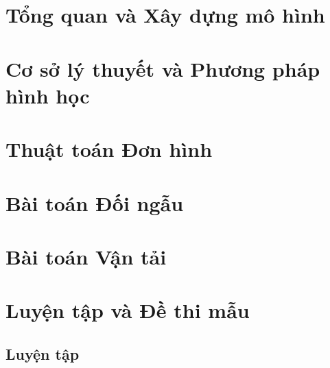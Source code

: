 \documentclass[12pt,a4paper]{book}
\begin{document}

 

\cleardoublepage
\frontmatter
{}
\setcounter{page}{1}
\pagestyle{plain}
\tableofcontents 
\listoffigures
\listoftables

\cleardoublepage
\mainmatter
{}
\setcounter{page}{1}
\pagestyle{plain}
\chapter{Tổng quan và Xây dựng mô hình }
    

\chapter{Cơ sở lý thuyết và Phương pháp hình học}
    
    
    
\chapter{Thuật toán Đơn hình}
    
    
\chapter{Bài toán Đối ngẫu}
    


\chapter{Bài toán Vận tải}
    

\chapter{Luyện tập và Đề thi mẫu}
    \section{Luyện tập}
    
    
    
    
    
\cleardoublepage
\appendix
\pagestyle{plain}



\end{document}
